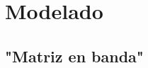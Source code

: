 \documentclass[12pt]{article}
\begin{document}
\section{Modelado}

\subsection{"Matriz en banda"}

\end{document}
